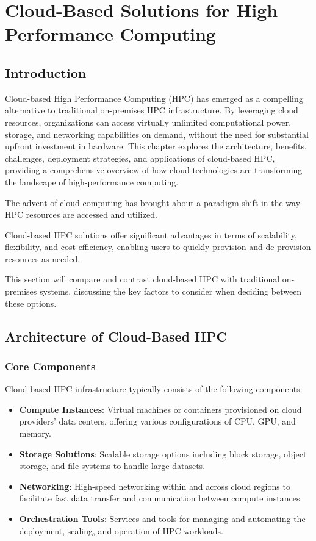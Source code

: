 

\chapter{Cloud-Based Solutions for High Performance Computing}

\section{Introduction}

Cloud-based High Performance Computing (HPC) has emerged as a compelling alternative to traditional on-premises HPC infrastructure. By leveraging cloud resources, organizations can access virtually unlimited computational power, storage, and networking capabilities on demand, without the need for substantial upfront investment in hardware. This chapter explores the architecture, benefits, challenges, deployment strategies, and applications of cloud-based HPC, providing a comprehensive overview of how cloud technologies are transforming the landscape of high-performance computing.

The advent of cloud computing has brought about a paradigm shift in the way HPC resources are accessed and utilized. 

Cloud-based HPC solutions offer significant advantages in terms of scalability, flexibility, and cost efficiency, enabling users to quickly provision and de-provision resources as needed. 

This section will compare and contrast cloud-based HPC with traditional on-premises systems, discussing the key factors to consider when deciding between these options.

\section{Architecture of Cloud-Based HPC}

\subsection{Core Components}

Cloud-based HPC infrastructure typically consists of the following components:

\begin{itemize}
    \item \textbf{Compute Instances}: Virtual machines or containers provisioned on cloud providers' data centers, offering various configurations of CPU, GPU, and memory.
    \item \textbf{Storage Solutions}: Scalable storage options including block storage, object storage, and file systems to handle large datasets.
    \item \textbf{Networking}: High-speed networking within and across cloud regions to facilitate fast data transfer and communication between compute instances.
    \item \textbf{Orchestration Tools}: Services and tools for managing and automating the deployment, scaling, and operation of HPC workloads.
\end{itemize}

